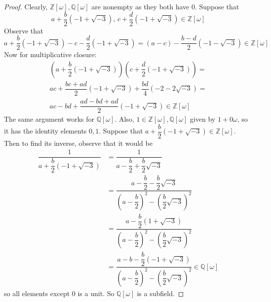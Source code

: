 \documentclass{article}
\begin{document}
    \begin{proof}
        Clearly, $\mathbb{Z}[\omega], \mathbb{Q}[\omega]$ are nonempty as they both have $0$. Suppose that
        \begin{equation*}
            a + \dfrac{b}{2}(-1 + \sqrt{-3}), \, c + \dfrac{d}{2}(-1 + \sqrt{-3}) \in \mathbb{Z}[\omega]
        \end{equation*}
        Observe that
        \begin{equation*}
            a + \dfrac{b}{2}(-1 + \sqrt{-3}) - c - \dfrac{d}{2}(-1 + \sqrt{-3}) = (a - c) - \dfrac{b - d}{2}(-1 - \sqrt{-3}) \in \mathbb{Z}[\omega]
        \end{equation*}
        Now for multiplicative closure:
        \begin{gather*}
            (a + \dfrac{b}{2}(-1 + \sqrt{-3}))(c + \dfrac{d}{2}(-1 + \sqrt{-3})) = \\
            ac + \dfrac{bc + ad}{2}(-1 + \sqrt{-3}) + \dfrac{bd}{4}(-2 - 2\sqrt{-3}) = \\
            ac - bd + \dfrac{ad - bd + ad}{2}(-1 + \sqrt{-3}) \in \mathbb{Z}[\omega]
        \end{gather*}
        The same argument works for $\mathbb{Q}[\omega]$. Also, $1 \in \mathbb{Z}[\omega], \mathbb{Q}[\omega]$ given by $1 + 0\omega$, so it has the identity elements $0, 1$. Suppose that $a + \dfrac{b}{2}(-1 + \sqrt{-3}) \in \mathbb{Z}[\omega]$. Then to find its inverse, observe that it would be 
        \begin{align*}
            \dfrac{1}{a + \dfrac{b}{2}(-1 + \sqrt{-3})} &= \dfrac{1}{a - \dfrac{b}{2} + \dfrac{b}{2}\sqrt{-3}} \\
                                                        &= \dfrac{a - \dfrac{b}{2} - \dfrac{b}{2}\sqrt{-3}}{\left( a - \dfrac{b}{2} \right)^{2} - \left( \dfrac{b}{2}\sqrt{-3} \right)^{2}} \\
                                                        &= \dfrac{a - \dfrac{b}{2}\left( 1 + \sqrt{-3} \right)}{\left( a - \dfrac{b}{2} \right)^{2} - \left( \dfrac{b}{2}\sqrt{-3} \right)^{2}} \\
                                                        &= \dfrac{a - b - \dfrac{b}{2}(-1 + \sqrt{-3})}{\left( a - \dfrac{b}{2} \right)^{2} - \left( \dfrac{b}{2}\sqrt{-3} \right)^{2}} \in \mathbb{Q}[\omega]
        \end{align*}
        so all elements except $0$ is a unit. So $\mathbb{Q}[\omega]$ is a subfield.
    \end{proof}
\end{document}
